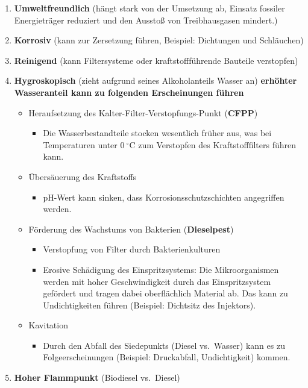 \begin{enumerate}
\item
  \textbf{Umweltfreundlich} (hängt stark von der Umsetzung ab, Einsatz
  fossiler Energieträger reduziert und den Ausstoß von Treibhausgasen
  mindert.)
\item
  \textbf{Korrosiv} (kann zur Zersetzung führen, Beispiel: Dichtungen
  und Schläuchen)
\item
  \textbf{Reinigend} (kann Filtersysteme oder kraftstoffführende
  Bauteile verstopfen)
\item
  \textbf{Hygroskopisch} (zieht aufgrund seines Alkoholanteils Wasser
  an) \textbf{erhöhter Wasseranteil kann zu folgenden Erscheinungen
  führen}

  \begin{itemize}
  \item
    Heraufsetzung des Kalter-Filter-Verstopfungs-Punkt (\textbf{CFPP})

    \begin{itemize}
    \item
      Die Wasserbestandteile stocken wesentlich früher aus, was bei
      Temperaturen unter $0~^\circ\text{C}$ zum Verstopfen des
      Kraftstofffilters führen kann.
    \end{itemize}
  \item
    Übersäuerung des Kraftstoffs

    \begin{itemize}
    \item
      pH-Wert kann sinken, dass Korrosionsschutzschichten angegriffen
      werden.
    \end{itemize}
  \item
    Förderung des Wachstums von Bakterien (\textbf{Dieselpest})

    \begin{itemize}
    \item
      Verstopfung von Filter durch Bakterienkulturen
    \item
      Erosive Schädigung des Einspritzsystems: Die Mikroorganismen
      werden mit hoher Geschwindigkeit durch das Einspritzsystem
      gefördert und tragen dabei oberflächlich Material ab. Das kann zu
      Undichtigkeiten führen (Beispiel: Dichtsitz des Injektors).
    \end{itemize}
  \item
    Kavitation

    \begin{itemize}
    \item
      Durch den Abfall des Siedepunkts (Diesel vs.~Wasser) kann es zu
      Folgeerscheinungen (Beispiel: Druckabfall, Undichtigkeit) kommen.
    \end{itemize}
  \end{itemize}
\item
  \textbf{Hoher Flammpunkt} (Biodiesel vs.~Diesel)


\end{enumerate}
